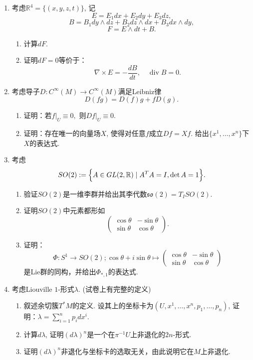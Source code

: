 \begin{enumerate}
    \item 考虑$\mathbb{R}^4=\{(x,y,z,t)\}$, 记
    $$E=E_1dx+E_2dy+E_3dz,$$
    $$B=B_1dy\wedge dz+B_2dz\wedge dx+B_3dx\wedge dy,$$
    $$F=E\wedge dt+B.$$
    \begin{enumerate}[label=(\arabic*)]
        \item 计算$dF$.
        \item 证明$dF=0$等价于：
        $$\nabla\times E=-\frac{dB}{dt},\quad\operatorname{div}B=0.$$
    \end{enumerate}
    \item 考虑导子$D:C^\infty(M)\to C^\infty (M)$满足Leibniz律
    $$D(fg)=D(f)g+fD(g).$$
    \begin{enumerate}[label=(\arabic*)]
        \item 证明：若$f|_U\equiv 0,$ 则$Df|_U\equiv0.$
        \item 证明：存在唯一的向量场$X$, 使得对任意$f$成立$Df=Xf$. 给出$\{x^1,\ldots,x^n\}$下$X$的表达式.
    \end{enumerate}
    \item 考虑$$SO(2):=\Bigl\{A\in GL(2,\mathbb{R})\mid A^TA=I,\det A=1\Bigr\}.$$
    \begin{enumerate}[label=(\arabic*)]
        \item 验证$SO(2)$是一维李群并给出其李代数$\mathfrak{so}(2)=T_ISO(2).$
        \item 证明$SO(2)$中元素都形如
        $$\begin{pmatrix}
            \cos\theta&-\sin\theta\\\sin\theta&\cos\theta
        \end{pmatrix}.$$
        \item 证明：
        $$\Phi:S^1\to SO(2);\cos\theta+i\sin\theta\mapsto\begin{pmatrix}\cos\theta&-\sin\theta\\\sin\theta&\cos\theta\end{pmatrix}$$
        是Lie群的同构，并给出$\Phi_{*,1}$的表达式.
    \end{enumerate}
    \item 考虑Liouville $1$-形式$\lambda$. (试卷上有完整的定义)
    \begin{enumerate}[label=(\arabic*)]
        \item 叙述余切簇$T^*M$的定义. 设其上的坐标卡为$(U,x^1,\ldots,x^n,p_1,\ldots,p_n)$, 证明：$\lambda=\sum_{i=1}^n p_idx^i.$
        \item 计算$d\lambda$, 证明$(d\lambda)^n$是一个在$\pi^{-1}U$上非退化的$2n$-形式.
        \item 证明$(d\lambda)^n$非退化与坐标卡的选取无关，由此说明它在$M$上非退化.
    \end{enumerate}

\end{enumerate}

